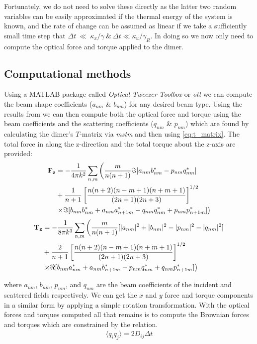 Fortunately, we do not need to solve these directly as the latter two
random variables can be easily approximated if the thermal energy of
the system is known, and the rate of change can be assumed as linear if
we take a sufficiently small time step that $\Delta t~\ll~\kappa_x/\gamma 
\ \& \ \Delta t \ll \kappa_u/\gamma_R$. In doing so we now only need 
to compute the optical force and torque applied to the dimer. 

\subsection{Computational methods}
Using a  MATLAB package called \textit{Optical Tweezer Toolbox} 
or \textit{ott} \cite{Nieminen2007} we can compute the beam 
shape coefficients ($a_{nm}$ \& $b_{nm}$) for any desired beam 
type. Using the results from \cite{Farsund1996} we can then 
compute both the optical force and torque using the beam 
coefficients and the scattering coefficients ($q_{nm}$ \& $p_{nm}$) 
which are found by calculating the dimer's $T$-matrix via \textit{mstm} 
\cite{Mackowski2011} and then using \eqref{eq:t_matrix}. The 
total force in along the z-direction and the total torque about 
the z-axis are provided:
\begin{equation}
	\label{eq:optical_force}
	\begin{split}
		\bold{F_z}
		&=
		-\frac{1}{4\pi k^2}\sum_{n,m} \left(\frac{m}{n(n+1)}\Im[a_{nm}b^*_{nm}-p_{nm}q^*_{nm}] \right.
		\\ 
		&+\frac{1}{n+1}\left[\frac{n(n+2)(n-m+1)(n+m+1)}{(2n+1)(2n+3)} \right]^{1/2}
		\\
		& \left.\times\Im[b_{nm}b^*_{nm}+a_{nm}a^*_{n+1m}-q_{nm}q^*_{nm}+p_{nm}p^*_{n+1m}] \right)
	\end{split}
\end{equation}
\begin{equation}
	\begin{split}
		\bold{T_z}
		&=
		-\frac{1}{8\pi k^3}\sum_{n,m} \left(\frac{m}{n(n+1)}[|a_{nm}|^2+|b_{nm}|^2-|p_{nm}|^2-|q_{nm}|^2] \right.
		\\ 
		&+\frac{2}{n+1}\left[\frac{n(n+2)(n-m+1)(n+m+1)}{(2n+1)(2n+3)} \right]^{1/2}
		\\
		& \left.\times\Re[b_{nm}a^*_{nm}+a_{nm}b^*_{n+1m}-p_{nm}q^*_{nm}+q_{nm}p^*_{n+1m}] \right)
	\end{split}
\end{equation}

where $a_{nm}$, $b_{nm}$, $p_{nm}$, and $q_{nm}$ are the beam 
coefficients of the incident and scattered fields respectively. 
We can get the $x$ and $y$ force and torque components in a 
similar form by applying a simple rotation transformation. With 
the optical forces and torques computed all that remains is to 
compute the Brownian forces and torques which are constrained 
by the relation.
\begin{align}
	\langle q_iq_j\rangle =2D_{ij}\Delta t
\end{align}

